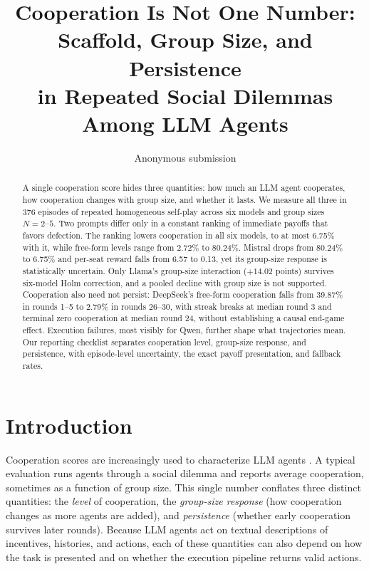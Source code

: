 \documentclass[11pt]{article}
\title{Cooperation Is Not One Number: Scaffold, Group Size, and Persistence\\in Repeated Social Dilemmas Among LLM Agents}
\author{Anonymous submission}
\begin{document}
\maketitle

\begin{abstract}
A single cooperation score hides three quantities: how much an LLM agent cooperates, how cooperation changes with group size, and whether it lasts. We measure all three in 376 episodes of repeated homogeneous self-play across six models and group sizes $N=2$--$5$. Two prompts differ only in a constant ranking of immediate payoffs that favors defection. The ranking lowers cooperation in all six models, to at most 6.75\% with it, while free-form levels range from 2.72\% to 80.24\%. Mistral drops from 80.24\% to 6.75\% and per-seat reward falls from 6.57 to 0.13, yet its group-size response is statistically uncertain. Only Llama's group-size interaction ($+14.02$ points) survives six-model Holm correction, and a pooled decline with group size is not supported. Cooperation also need not persist: DeepSeek's free-form cooperation falls from 39.87\% in rounds 1--5 to 2.79\% in rounds 26--30, with streak breaks at median round 3 and terminal zero cooperation at median round 24, without establishing a causal end-game effect. Execution failures, most visibly for Qwen, further shape what trajectories mean. Our reporting checklist separates cooperation level, group-size response, and persistence, with episode-level uncertainty, the exact payoff presentation, and fallback rates.
\end{abstract}

\section{Introduction}
Cooperation scores are increasingly used to characterize LLM agents \citep{akata2025repeated,fontana2025nicer,vallinder2025cultural}. A typical evaluation runs agents through a social dilemma and reports average cooperation, sometimes as a function of group size. This single number conflates three distinct quantities: the \emph{level} of cooperation, the \emph{group-size response} (how cooperation changes as more agents are added), and \emph{persistence} (whether early cooperation survives later rounds). Because LLM agents act on textual descriptions of incentives, histories, and actions, each of these quantities can also depend on how the task is presented and on whether the execution pipeline returns valid actions.
\end{document}
